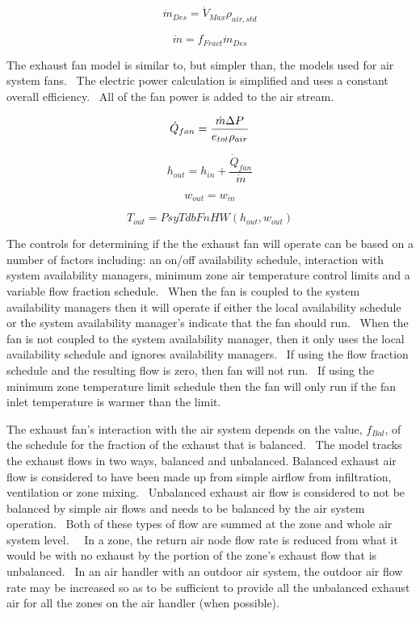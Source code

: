\begin{equation}
{\dot m_{Des}} = {\dot V_{Max}}{\rho_{air,std}}
\end{equation}

\begin{equation}
\dot m = {f_{Fract}}{\dot m_{Des}}
\end{equation}

The exhaust fan model is similar to, but simpler than, the models used for air system fans.~ The electric power calculation is simplified and uses a constant overall efficiency.~ All of the fan power is added to the air stream.

\begin{equation}
{\dot Q_{fan}} = \frac{{\dot m{\rm{}}\Delta P}}{{{e_{tot}}{\rho_{air}}}}
\end{equation}

\begin{equation}
{h_{out}} = {h_{in}} + \frac{{{{\dot Q}_{fan}}}}{{\dot m}}
\end{equation}

\begin{equation}
{w_{out}} = {w_{in}}
\end{equation}

\begin{equation}
{T_{out}} = PsyTdbFnHW\left( {{h_{out}},{w_{out}}} \right)
\end{equation}

The controls for determining if the the exhaust fan will operate can be based on a number of factors including: an on/off availability schedule, interaction with system availability managers, minimum zone air temperature control limits and a variable flow fraction schedule.~ When the fan is coupled to the system availability managers then it will operate if either the local availability schedule or the system availability manager's indicate that the fan should run.~ When the fan is not coupled to the system availability manager, then it only uses the local availability schedule and ignores availability managers.~ If using the flow fraction schedule and the resulting flow is zero, then fan will not run.~ If using the minimum zone temperature limit schedule then the fan will only run if the fan inlet temperature is warmer than the limit.

The exhaust fan's interaction with the air system depends on the value, \({f_{Bal}}\), of the schedule for the fraction of the exhaust that is balanced.~ The model tracks the exhaust flows in two ways, balanced and unbalanced. Balanced exhaust air flow is considered to have been made up from simple airflow from infiltration, ventilation or zone mixing.~ Unbalanced exhaust air flow is considered to not be balanced by simple air flows and needs to be balanced by the air system operation.~ Both of these types of flow are summed at the zone and whole air system level.~~ In a zone, the return air node flow rate is reduced from what it would be with no exhaust by the portion of the zone's exhaust flow that is unbalanced.~ In an air handler with an outdoor air system, the outdoor air flow rate may be increased so as to be sufficient to provide all the unbalanced exhaust air for all the zones on the air handler (when possible).
